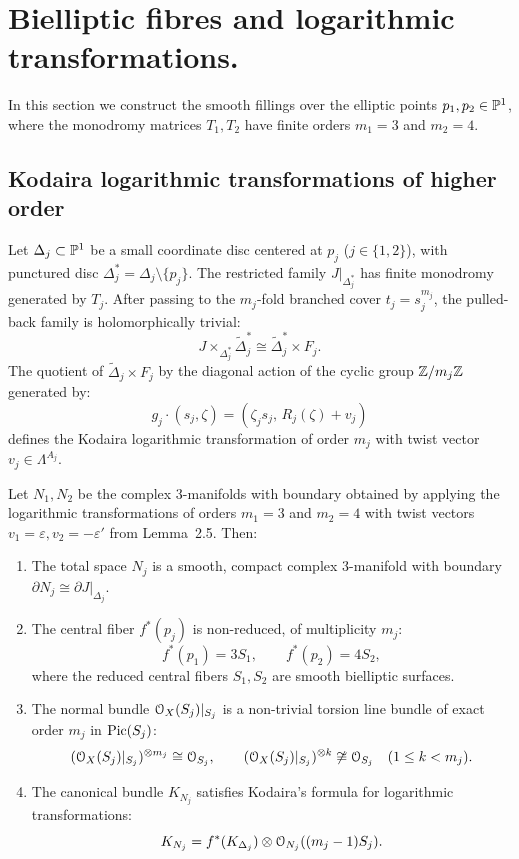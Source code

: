 \section{Bielliptic fibres and logarithmic transformations.}

In this section we construct the smooth fillings over the elliptic points $p_1, p_2 \in \mathbb{P}^1$, where the monodromy matrices $T_1, T_2$ have finite orders $m_1 = 3$ and $m_2 = 4$.

\subsection{Kodaira logarithmic transformations of higher order}

\begin{construction}\label{const:log-transforms}
Let $\Delta_j \subset \mathbb{P}^1$ be a small coordinate disc centered at $p_j$ ($j \in \{1, 2\}$), with punctured disc $\Delta_j^* = \Delta_j \setminus \{p_j\}$.
The restricted family $J|_{\Delta_j^*}$ has finite monodromy generated by $T_j$.
After passing to the $m_j$-fold branched cover $t_j = s_j^{m_j}$, the pulled-back family is holomorphically trivial:
\[
J \times_{\Delta_j^*} \widetilde\Delta_j^* \cong \widetilde\Delta_j^* \times F_j.
\]
The quotient of $\widetilde\Delta_j \times F_j$ by the diagonal action of the cyclic group $\mathbb{Z}/m_j\mathbb{Z}$ generated by:
\[
g_j \cdot (s_j, \zeta) = (\zeta_j s_j, \, R_j(\zeta) + v_j)
\]
defines the Kodaira logarithmic transformation of order $m_j$ with twist vector $v_j \in \Lambda^{A_j}$.
\end{construction}

\begin{theorem}\label{thm:bielliptic-reduction}
Let $N_1, N_2$ be the complex $3$-manifolds with boundary obtained by applying the logarithmic transformations of orders $m_1 = 3$ and $m_2 = 4$ with twist vectors $v_1 = \varepsilon, v_2 = -\varepsilon'$ from Lemma~2.5.
Then:
\begin{enumerate}[label=(\roman*)]
    \item The total space $N_j$ is a smooth, compact complex $3$-manifold with boundary $\partial N_j \cong \partial J|_{\Delta_j}$.
    \item The central fiber $f^*(p_j)$ is non-reduced, of multiplicity $m_j$:
    \[
    f^*(p_1) = 3S_1, \qquad f^*(p_2) = 4S_2,
    \]
    where the reduced central fibers $S_1, S_2$ are smooth bielliptic surfaces.
    \item The normal bundle $\mathcal{O}_X(S_j)|_{S_j}$ is a non-trivial torsion line bundle of exact order $m_j$ in $\mathrm{Pic}(S_j)$:
    \[
    (\mathcal{O}_X(S_j)|_{S_j})^{\otimes m_j} \cong \mathcal{O}_{S_j}, \qquad (\mathcal{O}_X(S_j)|_{S_j})^{\otimes k} \not\cong \mathcal{O}_{S_j} \quad (1 \le k < m_j).
    \]
    \item The canonical bundle $K_{N_j}$ satisfies Kodaira's formula for logarithmic transformations:
    \[
    K_{N_j} = f^*(K_{\Delta_j}) \otimes \mathcal{O}_{N_j}((m_j - 1)S_j).
    \]
\end{enumerate}
\end{theorem}

